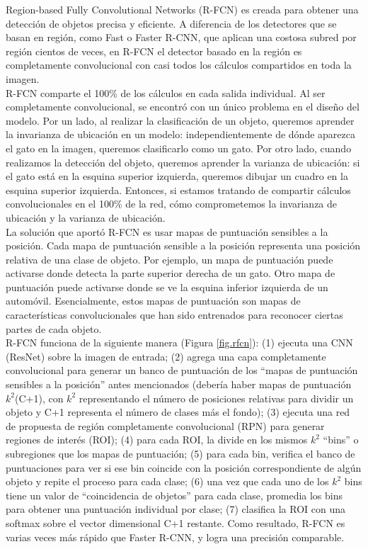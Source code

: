 \documentclass{bmvc2k}
\begin{document}
Region-based Fully Convolutional Networks (R-FCN) es creada para obtener una detección de objetos precisa y eficiente. A diferencia de los detectores que se basan en región, como Fast o Faster R-CNN, que aplican una costosa subred por región cientos de veces, en R-FCN el detector basado en la región es completamente convolucional con casi todos los cálculos compartidos en toda la imagen.\\ 

R-FCN comparte el 100\% de los cálculos en cada salida individual. Al ser completamente convolucional, se encontró con un único problema en el diseño del modelo. Por un lado, al realizar la clasificación de un objeto, queremos aprender la invarianza de ubicación en un modelo: independientemente de dónde aparezca el gato en la imagen, queremos clasificarlo como un gato. Por otro lado, cuando realizamos la detección del objeto, queremos aprender la varianza de ubicación: si el gato está en la esquina superior izquierda, queremos dibujar un cuadro en la esquina superior izquierda. Entonces, si estamos tratando de compartir cálculos convolucionales en el 100\% de la red, cómo comprometemos la invarianza de ubicación y la varianza de ubicación.\\

La solución que aportó R-FCN es usar mapas de puntuación sensibles a la posición. Cada mapa de puntuación sensible a la posición representa una posición relativa de una clase de objeto. Por ejemplo, un mapa de puntuación puede activarse donde detecta la parte superior derecha de un gato. Otro mapa de puntuación puede activarse donde se ve la esquina inferior izquierda de un automóvil. Esencialmente, estos mapas de puntuación son mapas de características convolucionales que han sido entrenados para reconocer ciertas partes de cada objeto.\\

R-FCN funciona de la siguiente manera (Figura \ref{fig.rfcn}): (1) ejecuta una CNN (ResNet) sobre la imagen de entrada; (2) agrega una capa completamente convolucional para generar un banco de puntuación de los ``mapas de puntuación sensibles a la posición'' antes mencionados (debería haber mapas de puntuación $k^{2}$(C+1), con $k^{2}$ representando el número de posiciones relativas para dividir un objeto y C+1 representa el número de clases más el fondo); (3) ejecuta una red de propuesta de región completamente convolucional (RPN) para generar regiones de interés (ROI); (4) para cada ROI, la divide en los mismos $k^{2}$ ``bins'' o subregiones que los mapas de puntuación; (5) para cada bin, verifica el banco de puntuaciones para ver si ese bin coincide con la posición correspondiente de algún objeto y repite el proceso para cada clase; (6) una vez que cada uno de los $k^{2}$ bins tiene un valor de ``coincidencia de objetos'' para cada clase, promedia los bins para obtener una puntuación individual por clase; (7) clasifica la ROI con una softmax sobre el vector dimensional C+1 restante. Como resultado, R-FCN es varias veces más rápido que Faster R-CNN, y logra una precisión comparable.\\
\end{document}
